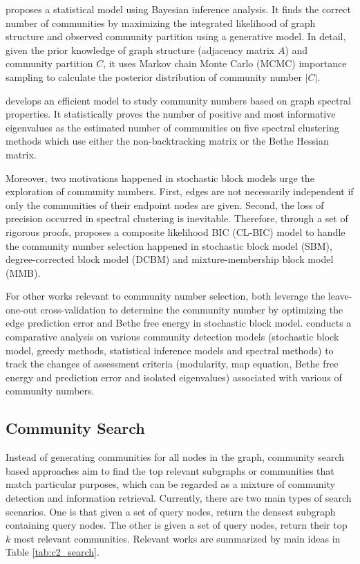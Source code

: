 \cite{newman2016estimating} proposes a statistical model using Bayesian inference analysis. It finds the correct number of communities by maximizing the integrated likelihood of graph structure and observed community partition using a generative model. In detail, given the prior knowledge of graph structure (adjacency matrix $A$) and community partition $C$, it uses Markov chain Monte Carlo (MCMC) importance sampling to calculate the posterior distribution of community number $|C|$.

\cite{le2015estimating} develops an efficient model to study community numbers based on graph spectral properties. It statistically proves the number of positive and most informative eigenvalues as the estimated number of communities on five spectral clustering methods which use either the non-backtracking matrix or the Bethe Hessian matrix. 

Moreover, two motivations happened in stochastic block models urge the exploration of community numbers. First, edges are not necessarily independent if only the communities of their endpoint nodes are given. Second, the loss of precision occurred in spectral clustering is inevitable. Therefore, through a set of rigorous proofs, \cite{saldana2017many} proposes a composite likelihood BIC (CL-BIC) model to handle the community number selection  happened in stochastic block model (SBM), degree-corrected block model (DCBM) and mixture-membership block model (MMB). 

For other works relevant to community number selection, \cite{kawamoto2017cross,chen2018network} both leverage the leave-one-out cross-validation to determine the community number by optimizing the edge prediction error and Bethe free energy in stochastic block model.  \cite{kawamoto2018comparative} conducts a comparative analysis on various community detection models (stochastic block model, greedy methods, statistical inference models and spectral methods) to track the changes of assessment criteria (modularity, map equation, Bethe free energy and prediction error and isolated eigenvalues) associated with various of community numbers.

\subsection{Community Search}
Instead of generating communities for all nodes in the graph, community search based approaches aim to find the top relevant subgraphs or communities that match particular purposes, which can be regarded as a mixture of community detection and information retrieval. Currently, there are two main types of search scenarios. One is that given a set of query nodes, return the densest subgraph containing query nodes. The other is given a set of query nodes, return their top $k$ most relevant communities. Relevant works are summarized by main ideas in Table \ref{tab:c2_search}.

